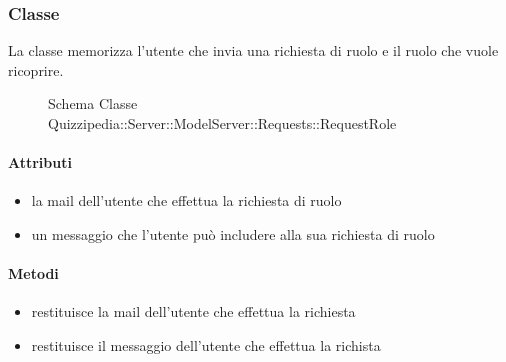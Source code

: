 \subsubsection{Classe }
La classe memorizza l'utente che invia una richiesta di ruolo e il ruolo che vuole ricoprire.
\begin{figure}[H]
\centering
\noindent{}
\caption[Schema Classe RequestRole]{Schema Classe Quizzipedia::Server::ModelServer::Requests::RequestRole}
\end{figure}
\paragraph{Attributi}
\begin{itemize}
\item {}
\newline
la mail dell'utente che effettua la richiesta di ruolo
\item {}
\newline
un messaggio che l'utente può includere alla sua richiesta di ruolo
\end{itemize}
\paragraph{Metodi}
\begin{itemize}
\item {}
\newline
restituisce la mail dell'utente che effettua la richiesta
\newline
\item {}
\newline
restituisce il messaggio dell'utente che effettua la richista
\newline
\end{itemize}
